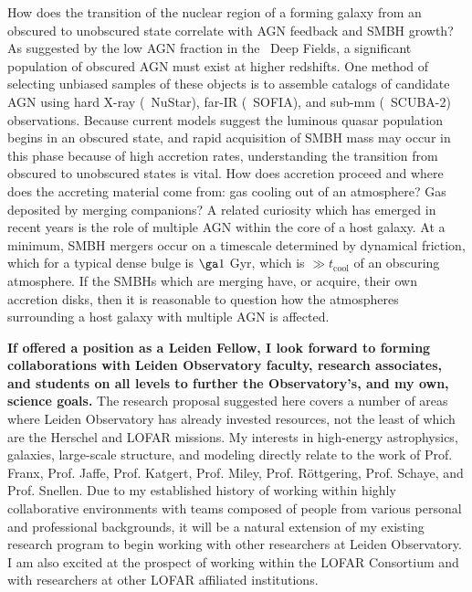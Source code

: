 \documentclass[11pt]{article}
\begin{document}
How does the transition of the nuclear region of a forming galaxy from
an obscured to unobscured state correlate with AGN feedback and SMBH
growth? As suggested by the low AGN fraction in the \chandra\ Deep
Fields, a significant population of obscured AGN must exist at higher
redshifts. One method of selecting unbiased samples of these objects
is to assemble catalogs of candidate AGN using hard X-ray (\ie\
NuStar), far-IR (\ie\ SOFIA), and sub-mm (\ie\ SCUBA-2)
observations. Because current models suggest the luminous quasar
population begins in an obscured state, and rapid acquisition of SMBH
mass may occur in this phase because of high accretion rates,
understanding the transition from obscured to unobscured states is
vital. How does accretion proceed and where does the accreting
material come from: gas cooling out of an atmosphere? Gas deposited by
merging companions? A related curiosity which has emerged in recent
years is the role of multiple AGN within the core of a host galaxy. At
a minimum, SMBH mergers occur on a timescale determined by dynamical
friction, which for a typical dense bulge is $\ga 1$ Gyr, which is
$\gg t_{\mathrm{cool}}$ of an obscuring atmosphere. If the SMBHs which
are merging have, or acquire, their own accretion disks, then it is
reasonable to question how the atmospheres surrounding a host galaxy
with multiple AGN is affected.

{\bf{If offered a position as a Leiden Fellow, I look forward to
forming collaborations with Leiden Observatory faculty, research
associates, and students on all levels to further the Observatory's,
and my own, science goals.}} The research proposal suggested here
covers a number of areas where Leiden Observatory has already invested
resources, not the least of which are the Herschel and LOFAR
missions. My interests in high-energy astrophysics, galaxies,
large-scale structure, and modeling directly relate to the work of
Prof. Franx, Prof. Jaffe, Prof. Katgert, Prof. Miley,
Prof. R\"ottgering, Prof. Schaye, and Prof. Snellen. Due to my
established history of working within highly collaborative
environments with teams composed of people from various personal and
professional backgrounds, it will be a natural extension of my
existing research program to begin working with other researchers at
Leiden Observatory. I am also excited at the prospect of working
within the LOFAR Consortium and with researchers at other LOFAR
affiliated institutions.
\end{document}
